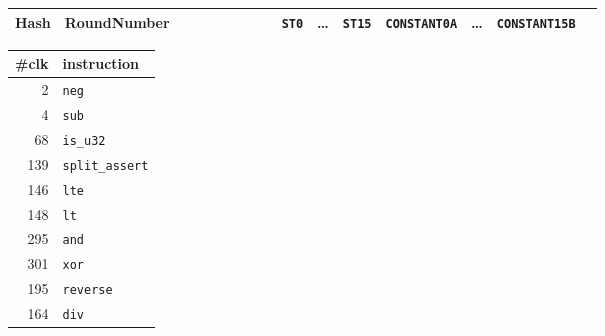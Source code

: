 \documentclass{article}
\begin{document}
{\begin{tabular}{lllllllllllllllllllllll}
    Hash        & \multicolumn{4}{l}{RoundNumber}                             &                   &              &                     &              &              &              &              & \texttt{ST0} & \dots & \texttt{ST15} & \multicolumn{3}{l}{\texttt{CONSTANT0A}}    & \dots & \multicolumn{3}{l}{\texttt{CONSTANT15B}}     &               \\ \bottomrule
\end{tabular}
} %
\vfill%
\begin{minipage}{0.3\textwidth}
    \begin{tabular}{rl}
        \toprule
        \#clk & instruction            \\ \midrule
            2 & \texttt{neg}           \\
            4 & \texttt{sub}           \\
           68 & \texttt{is\_u32}       \\
          139 & \texttt{split\_assert} \\
          146 & \texttt{lte}           \\
          148 & \texttt{lt}            \\
          295 & \texttt{and}           \\
          301 & \texttt{xor}           \\
          195 & \texttt{reverse}       \\
          164 & \texttt{div}           \\ \bottomrule
    \end{tabular}
\end{minipage}
\end{document}
